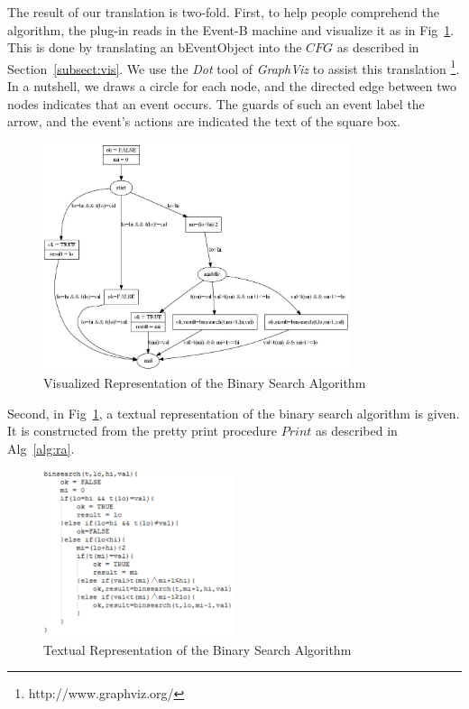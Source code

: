 \documentclass{easychair}
\begin{document}
The result of our translation is two-fold. First, to help people comprehend the algorithm, the plug-in reads in the Event-B machine and visualize it as in Fig~\ref{fig:pix}. This is done by translating an bEventObject into the $CFG$ as described in Section~\ref{subsect:vis}. We use the \textit{Dot} tool of \textit{GraphViz} to assist this translation \footnote{http://www.graphviz.org/}. In a nutshell, we draws a circle for each node, and the directed edge between two nodes indicates that an event occurs. The guards of such an event label the arrow, and the event's actions are indicated the text of the square box. 

\begin{figure}[!h]
  \centering
    \includegraphics[width=0.8\textwidth]{img/pix.jpg}
  \caption{Visualized Representation of the Binary Search Algorithm}
  \label{fig:pix}
\end{figure}

Second, in Fig~\ref{fig:pix}, a textual representation of the binary search algorithm is given. It is constructed from the pretty print procedure $Print$ as described in Alg~\ref{alg:ra}.
\begin{figure}[!h]
  \centering
    \includegraphics[width=0.5\textwidth]{img/alg.jpg}
  \caption{Textual Representation of the Binary Search Algorithm}
  \label{fig:alg}
\end{figure}
\end{document}
